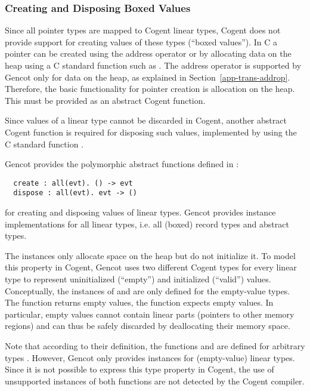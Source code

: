 \subsubsection{Creating and Disposing Boxed Values}

Since all pointer types are mapped to Cogent linear types, Cogent does not provide support for creating values
of these types (``boxed values''). In C a pointer can be created using the address operator \code{\&} or by allocating data on
the heap using a C standard function such as . The address operator is supported by Gencot
only for data on the heap, as explained in Section~\ref{app-trans-addrop}. Therefore, the basic functionality
for pointer creation is allocation on the heap. This must be provided as an abstract Cogent function.

Since values of a linear type cannot be discarded in Cogent, another abstract Cogent function is required for
disposing such values, implemented by using the C standard function .

Gencot provides the polymorphic abstract functions defined in :
\begin{verbatim}
  create : all(evt). () -> evt
  dispose : all(evt). evt -> ()
\end{verbatim}
for creating and disposing values of linear types. Gencot provides instance implementations for all linear
types, i.e. all (boxed) record types and abstract types.

The  instances only allocate space on the heap but do not initialize it. To model this property in 
Cogent, Gencot uses two different Cogent types for every linear type to represent uninitialized (``empty'') and 
initialized (``valid'') values.
Conceptually, the instances of  and  are only defined for the empty-value types.
The function  returns empty values, the function  expects empty values. In particular,
empty values cannot contain linear parts (pointers to other memory regions) and can thus be safely discarded by 
deallocating their memory space. 

Note that according to their definition, the functions  and  are defined for arbitrary
types . However, Gencot only provides instances for (empty-value) linear types. Since it is not possible
to express this type property in Cogent, the use of unsupported instances of both functions are not detected by the 
Cogent compiler.

